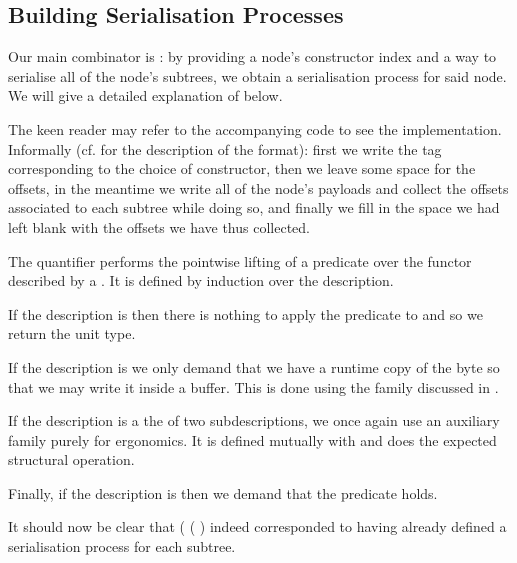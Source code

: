 \subsection{Building Serialisation Processes}

Our main combinator is \IdrisFunction{(\#)}: by providing
a node's constructor index
and a way to serialise all of the node's subtrees,
we obtain a serialisation process for said node.
%
We will give a detailed explanation of  below.


The keen reader may refer to the accompanying code to see the implementation.
Informally (cf.  for the description of the format):
first we write the tag corresponding to the choice of constructor,
then we leave some space for the offsets,
in the meantime we write all of the node's payloads and collect the offsets
associated to each subtree while doing so,
and finally we fill in the space we had left blank with the offsets
we have thus collected.

The  quantifier performs the pointwise lifting of a predicate over
the functor described by a . It is defined by induction over
the description.


If the description is  then there is nothing to apply
the predicate to and so we return the unit type.

If the description is  we only demand that we have a runtime
copy of the byte so that we may write it inside a buffer. This is done using
the  family discussed in .

If the description is a the  of two subdescriptions, we once
again use an auxiliary family purely for ergonomics. It is defined mutually
with  and does the expected structural operation.


Finally, if the description is  then we demand that the
predicate holds.

It should now be clear that
( \IdrisKeyword{(} \IdrisKeyword{)}
( \IdrisKeyword{)}) indeed corresponded
to having already defined a serialisation process for each subtree.

